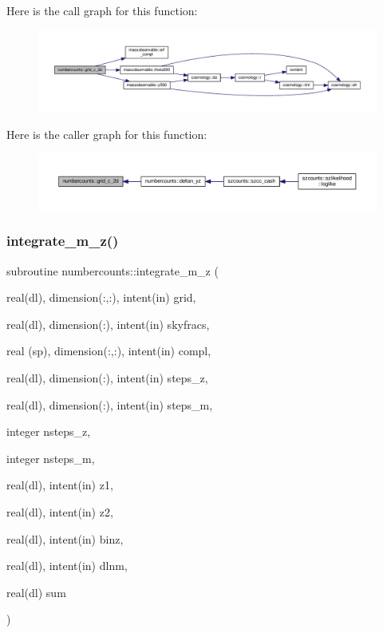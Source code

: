 Here is the call graph for this function\+:
\nopagebreak
\begin{figure}[H]
\begin{center}
\leavevmode
\includegraphics[width=350pt]{namespacenumbercounts_a9147710c647a39e457fa04786c7c295d_cgraph}
\end{center}
\end{figure}
Here is the caller graph for this function\+:
\nopagebreak
\begin{figure}[H]
\begin{center}
\leavevmode
\includegraphics[width=350pt]{namespacenumbercounts_a9147710c647a39e457fa04786c7c295d_icgraph}
\end{center}
\end{figure}
\mbox{\label{namespacenumbercounts_ad089fdedf2c506bc8fc9dfb1ce45c024}} 
\subsubsection{\texorpdfstring{integrate\+\_\+m\+\_\+z()}{integrate\_m\_z()}}
{\footnotesize\ttfamily subroutine numbercounts\+::integrate\+\_\+m\+\_\+z (\begin{DoxyParamCaption}\item[{real(dl), dimension(\+:,\+:), intent(in)}]{grid,  }\item[{real(dl), dimension(\+:), intent(in)}]{skyfracs,  }\item[{real (sp), dimension(\+:,\+:), intent(in)}]{compl,  }\item[{real(dl), dimension(\+:), intent(in)}]{steps\+\_\+z,  }\item[{real(dl), dimension(\+:), intent(in)}]{steps\+\_\+m,  }\item[{integer}]{nsteps\+\_\+z,  }\item[{integer}]{nsteps\+\_\+m,  }\item[{real(dl), intent(in)}]{z1,  }\item[{real(dl), intent(in)}]{z2,  }\item[{real(dl), intent(in)}]{binz,  }\item[{real(dl), intent(in)}]{dlnm,  }\item[{real(dl)}]{sum }\end{DoxyParamCaption})}



